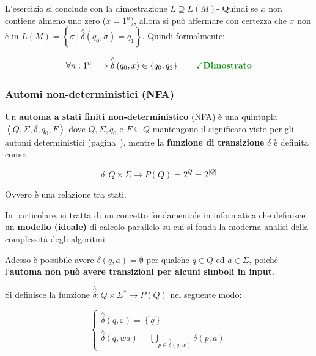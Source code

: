 \documentclass[a4paper]{article}
\begin{document}
	L'esercizio si conclude con la dimostrazione $L \supseteq L\left(M\right)$- Quindi se $x$ non contiene almeno uno zero ($x = 1^{n}$), allora si può affermare con certezza che $x$ non è in $L\left(M\right) = \left\{\sigma \: | \: \overset{\wedge}{\delta} \left(q_{0}, \sigma\right) = q_{1}\right\}$. Quindi formalmente:
	
	\begin{equation*}
		\forall n : 1^{n} \Longrightarrow \overset{\wedge}{\delta} \left(q_{0}, x\right) \in \left\{q_{0}, q_{2}\right\} \hspace{2em} \textcolor{Green4}{\textbf{\checkmark Dimostrato}}
	\end{equation*}

	\newpage
	
	\subsubsection{Automi non-deterministici (NFA)}\label{automi non-deterministici}
	
	Un \textbf{automa a stati finiti \underline{non-deterministico}} (NFA) è una quintupla $\left\langle Q, \Sigma, \delta, q_0, F\right\rangle$ dove $Q, \Sigma, q_{0}$ e $F \subseteq Q$ mantengono il significato visto per gli automi deterministici (pagina~\pageref{automi deterministici}), mentre la \textbf{funzione di transizione} $\delta$ è definita come:
	
	\begin{equation*}
		\delta : Q \times \Sigma \longrightarrow P(Q) = 2^{Q} = 2^{|Q|}
	\end{equation*}

	\noindent
	Ovvero è una relazione tra stati.

	In particolare, si tratta di un concetto fondamentale in informatica che definisce un \textbf{modello (ideale)} di calcolo parallelo su cui si fonda la moderna analisi della complessità degli algoritmi.
	
	Adesso è possibile avere $\delta \left(q, a\right) = \emptyset$ per qualche $q \in Q$ ed $a \in \Sigma$, poiché l'\textcolor{Red3}{\textbf{automa non può avere transizioni per alcuni simboli in input}}.\newline
	
	\noindent
	Si definisce la funzione $\overset{\wedge}{\delta} : Q \times \Sigma^{*} \longrightarrow P\left(Q\right)$ nel seguente modo:
	
	\begin{equation*}
		\begin{cases}
			\overset{\wedge}{\delta} \left(q, \varepsilon\right) = \left\{q\right\} \\
			\overset{\wedge}{\delta} \left(q, wa\right) = \bigcup_{p \in \overset{\wedge}{\delta} \left(q, w\right)} \delta \left(p, a\right)
		\end{cases}
	\end{equation*}
\end{document}
